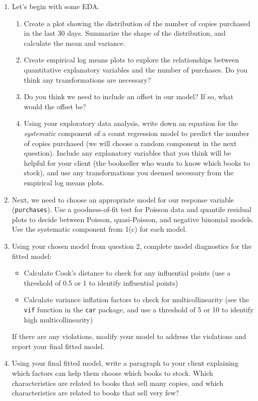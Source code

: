 \documentclass[11pt]{article}
\begin{document}
\begin{enumerate}

\item Let's begin with some EDA.
\begin{enumerate}
\item Create a plot showing the distribution of the number of copies purchased in the last 30 days. Summarize the shape of the distribution, and calculate the mean and variance.

\item Create empirical log means plots to explore the relationships between quantitative explanatory variables and the number of purchases. Do you think any transformations are necessary?

\item Do you think we need to include an offset in our model? If so, what would the offset be?

\item Using your exploratory data analysis, write down an equation for the \textit{systematic} component of a count regression model to predict the number of copies purchased (we will choose a random component in the next question). Include any explanatory variables that you think will be helpful for your client (the bookseller who wants to know which books to stock), and use any transformations you deemed necessary from the empirical log means plots.
\end{enumerate}

\item Next, we need to choose an appropriate model for our response variable (\texttt{purchases}). Use a goodness-of-fit test for Poisson data and quantile residual plots to decide between Poisson, quasi-Poisson, and negative binomial models. Use the systematic component from 1(c) for each model.

\item Using your chosen model from question 2, complete model diagnostics for the fitted model:
\begin{itemize}
\item Calculate Cook's distance to check for any influential points (use a threshold of 0.5 or 1 to identify influential points)
\item Calculate variance inflation factors to check for multicollinearity (see the \verb;vif; function in the \verb;car; package, and use a threshold of 5 or 10 to identify high multicollinearity)
\end{itemize}
If there are any violations, modify your model to address the violations and report your final fitted model.

\item Using your final fitted model, write a paragraph to your client explaining which factors can help them choose which books to stock. Which characteristics are related to books that sell many copies, and which characteristics are related to books that sell very few?

\end{enumerate}
\end{document}
